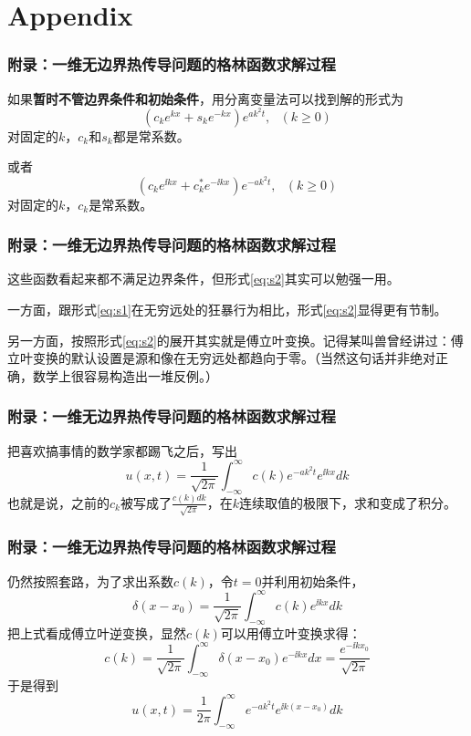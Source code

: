 \documentclass[CJK]{beamer}
\begin{document}
\section{Appendix}

\begin{frame}
  \frametitle{附录：一维无边界热传导问题的格林函数求解过程}
  
  如果{\bf 暂时不管边界条件和初始条件}，用分离变量法可以找到解的形式为
  \begin{equation}
    \left(c_k e^{k x} + s_k e^{-k x}\right) e^{ak^2t},\ \ \ (k\ge 0) \label{eq:s1}
  \end{equation}
  对固定的$k$，$c_k$和$s_k$都是常系数。

  或者
  \begin{equation}
    \left(c_k e^{\ii k x} + c_k^* e^{-\ii k x}\right) e^{- ak^2t},\ \ \ (k\ge 0) \label{eq:s2}
  \end{equation}
  对固定的$k$，$c_k$是常系数。
  
\end{frame}

\begin{frame}
  \frametitle{附录：一维无边界热传导问题的格林函数求解过程}
  这些函数看起来都不满足边界条件，但形式\eqref{eq:s2}其实可以勉强一用。

  一方面，跟形式\eqref{eq:s1}在无穷远处的狂暴行为相比，形式\eqref{eq:s2}显得更有节制。

  另一方面，按照形式\eqref{eq:s2}的展开其实就是傅立叶变换。记得某叫兽曾经讲过：{\blue 傅立叶变换的默认设置是源和像在无穷远处都趋向于零。}（当然这句话并非绝对正确，数学上很容易构造出一堆反例。）

\end{frame}

\begin{frame}
  \frametitle{附录：一维无边界热传导问题的格林函数求解过程}  
  把喜欢搞事情的数学家都踢飞之后，写出
  $$ u(x,t) = \frac{1}{\sqrt{2\pi}}\int_{-\infty}^\infty c(k) e^{-ak^2t}e^{\ii k x} dk $$
  也就是说，之前的$c_k$被写成了$\frac{c(k)dk}{\sqrt{2\pi}}$，在$k$连续取值的极限下，求和变成了积分。
  
\end{frame}


\begin{frame}
  \frametitle{附录：一维无边界热传导问题的格林函数求解过程}
  
  仍然按照套路，为了求出系数$c(k)$，令$t=0$并利用初始条件，
  $$ \delta(x-x_0) = \frac{1}{\sqrt{2\pi}}\int_{-\infty}^\infty c(k) e^{\ii k x} dk $$
  把上式看成傅立叶逆变换，显然$c(k)$可以用傅立叶变换求得：
  $$ c(k) = \frac{1}{\sqrt{2\pi}}\int_{-\infty}^\infty  \delta(x-x_0)e^{-\ii kx}dx = \frac{ e^{-\ii kx_0}}{\sqrt{2\pi}} $$
  于是得到
  $$ u(x,t) = \frac{1}{2\pi}\int_{-\infty}^\infty e^{-ak^2t}e^{\ii k (x-x_0)} dk $$
  
  
\end{frame}
\end{document}

